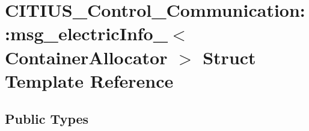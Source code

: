 \hypertarget{struct_c_i_t_i_u_s___control___communication_1_1msg__electric_info__}{\section{\-C\-I\-T\-I\-U\-S\-\_\-\-Control\-\_\-\-Communication\-:\-:msg\-\_\-electric\-Info\-\_\-$<$ \-Container\-Allocator $>$ \-Struct \-Template \-Reference}
\label{struct_c_i_t_i_u_s___control___communication_1_1msg__electric_info__}
}
\subsection*{\-Public \-Types}
